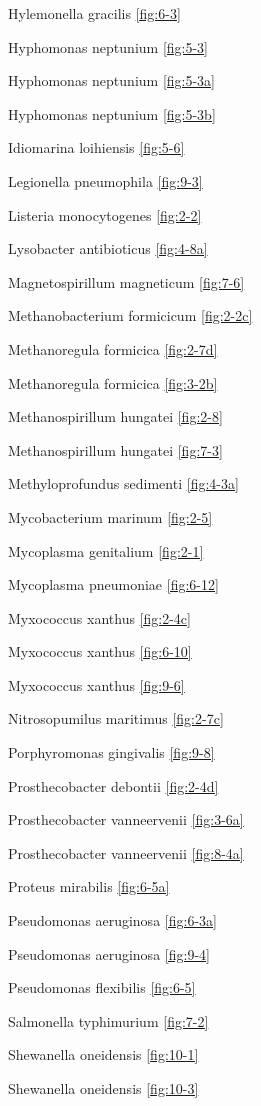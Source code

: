 \documentclass[]{tufte-book}
\begin{document}
Hylemonella gracilis \ref{fig:6-3}

Hyphomonas neptunium \ref{fig:5-3}

Hyphomonas neptunium \ref{fig:5-3a}

Hyphomonas neptunium \ref{fig:5-3b}

Idiomarina loihiensis \ref{fig:5-6}

Legionella pneumophila \ref{fig:9-3}

Listeria monocytogenes \ref{fig:2-2}

Lysobacter antibioticus \ref{fig:4-8a}

Magnetospirillum magneticum \ref{fig:7-6}

Methanobacterium formicicum \ref{fig:2-2c}

Methanoregula formicica \ref{fig:2-7d}

Methanoregula formicica \ref{fig:3-2b}

Methanospirillum hungatei \ref{fig:2-8}

Methanospirillum hungatei \ref{fig:7-3}

Methyloprofundus sedimenti \ref{fig:4-3a}

Mycobacterium marinum \ref{fig:2-5}

Mycoplasma genitalium \ref{fig:2-1}

Mycoplasma pneumoniae \ref{fig:6-12}

Myxococcus xanthus \ref{fig:2-4c}

Myxococcus xanthus \ref{fig:6-10}

Myxococcus xanthus \ref{fig:9-6}

Nitrosopumilus maritimus \ref{fig:2-7c}

Porphyromonas gingivalis \ref{fig:9-8}

Prosthecobacter debontii \ref{fig:2-4d}

Prosthecobacter vanneervenii \ref{fig:3-6a}

Prosthecobacter vanneervenii \ref{fig:8-4a}

Proteus mirabilis \ref{fig:6-5a}

Pseudomonas aeruginosa \ref{fig:6-3a}

Pseudomonas aeruginosa \ref{fig:9-4}

Pseudomonas flexibilis \ref{fig:6-5}

Salmonella typhimurium \ref{fig:7-2}

Shewanella oneidensis \ref{fig:10-1}

Shewanella oneidensis \ref{fig:10-3}
\end{document}
